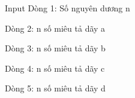 Input
Dòng 1: Số nguyên dương n  

   Dòng 2: n số miêu tả dãy a  

   Dòng 3: n số miêu tả dãy b  

   Dòng 4: n số miêu tả dãy c  

   Dòng 5: n số miêu tả dãy d